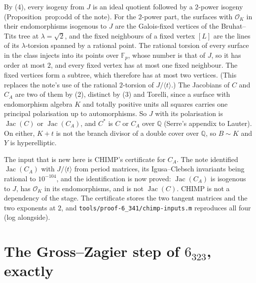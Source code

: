 \documentclass[11pt,reqno]{amsart}
\theoremstyle{plain}
\theoremstyle{definition}
\DeclareMathOperator{\Jac}{Jac}
\newcommand{\Q}{\mathbb{Q}}
\newcommand{\F}{\mathbb{F}}
\begin{document}
By (4), every isogeny from $J$ is an ideal quotient followed by a $2$-power isogeny (Proposition~prop:odd of the
note). For the $2$-power part, the surfaces with $\mathcal O_K$ in their endomorphisms isogenous to $J$ are the
Galois-fixed vertices of the Bruhat--Tits tree at $\lambda=\sqrt2$, and the fixed neighbours of a fixed vertex
$[L]$ are the lines of its $\lambda$-torsion spanned by a rational point. The rational torsion of every surface
in the class injects into its points over $\F_p$, whose number is that of $J$, so it has order at most $2$, and
every fixed vertex has at most one fixed neighbour. The fixed vertices form a subtree, which therefore has at
most two vertices. (This replaces the note's use of the rational $2$-torsion of $J/\langle t\rangle$.) The Jacobians
of $C$ and $C_A$ are two of them by (2), distinct by (3) and Torelli, since a surface with endomorphism algebra
$K$ and totally positive units all squares carries one principal polarisation up to automorphisms. So $J$ with its
polarisation is $\Jac(C)$ or $\Jac(C_A)$, and $C^*$ is $C$ or $C_A$ over $\Q$ (Serre's appendix to Lauter). On
either, $K+t$ is not the branch divisor of a double cover over $\Q$, so $B\sim K$ and $Y$ is hyperelliptic.

The input that is new here is CHIMP's certificate for $C_A$. The note identified $\Jac(C_A)$ with $J/\langle t\rangle$
from period matrices, its Igusa--Clebsch invariants being rational to $10^{-104}$, and the identification is now
proved: $\Jac(C_A)$ is isogenous to $J$, has $\mathcal O_K$ in its endomorphisms, and is not $\Jac(C)$. CHIMP is not a
dependency of the stage. The certificate stores the two tangent matrices and the two exponents at $2$, and
\texttt{tools/proof-6\_341/chimp-inputs.m} reproduces all four (log alongside).

\section{The Gross--Zagier step of $6_{323}$, exactly}
\end{document}

